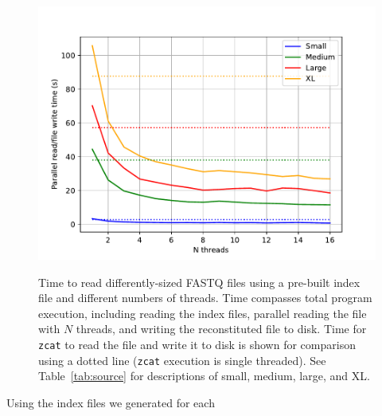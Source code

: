 \begin{figure}[h]
    \includegraphics[width=\linewidth]{figs/cores.pdf}
    \label{fig:cores}
    \caption{Time to read differently-sized FASTQ \gzip files using a pre-built
    index file and different numbers of threads. Time compasses total program
    execution, including reading the index files, parallel reading the \gzip
    file with $N$ threads, and writing the reconstituted file to disk. Time for
    \texttt{zcat} to read the file and write it to disk is shown for comparison
    using a dotted line (\texttt{zcat} execution is single threaded). See
    Table~\ref{tab:source} for descriptions of small, medium, large, and XL.}
\end{figure}

Using the index files we generated for each 


